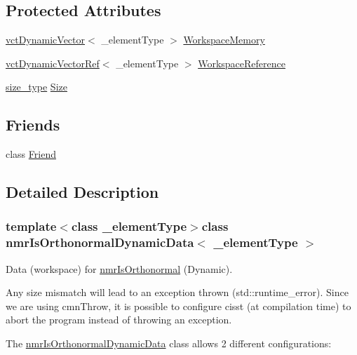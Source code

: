 \subsection*{Protected Attributes}
\begin{DoxyCompactItemize}
\item 
\hyperlink{classvct_dynamic_vector}{vct\+Dynamic\+Vector}$<$ \+\_\+element\+Type $>$ \hyperlink{classnmr_is_orthonormal_dynamic_data_aa64db85fa3c9904a4fb2c917dd171ae6}{Workspace\+Memory}
\item 
\hyperlink{classvct_dynamic_vector_ref}{vct\+Dynamic\+Vector\+Ref}$<$ \+\_\+element\+Type $>$ \hyperlink{classnmr_is_orthonormal_dynamic_data_a70b7864b872ab20af9400584387f3c21}{Workspace\+Reference}
\item 
\hyperlink{classnmr_is_orthonormal_dynamic_data_ae69581f9b270b49b1cd1d16ff29a5409}{size\+\_\+type} \hyperlink{classnmr_is_orthonormal_dynamic_data_a0335e18e8d4291e9c9ce6f6c3b7f68f0}{Size}
\end{DoxyCompactItemize}
\subsection*{Friends}
\begin{DoxyCompactItemize}
\item 
class \hyperlink{classnmr_is_orthonormal_dynamic_data_a7f8321d57e81bc613d5dbef3410ba70e}{Friend}
\end{DoxyCompactItemize}


\subsection{Detailed Description}
\subsubsection*{template$<$class \+\_\+element\+Type$>$class nmr\+Is\+Orthonormal\+Dynamic\+Data$<$ \+\_\+element\+Type $>$}

Data (workspace) for \hyperlink{nmr_is_orthonormal_8h_acf0ff1e2dbe0c988db04d9db1e2e7697}{nmr\+Is\+Orthonormal} (Dynamic). 

Any size mismatch will lead to an exception thrown (std\+::runtime\+\_\+error). Since we are using cmn\+Throw, it is possible to configure cisst (at compilation time) to abort the program instead of throwing an exception.

The \hyperlink{classnmr_is_orthonormal_dynamic_data}{nmr\+Is\+Orthonormal\+Dynamic\+Data} class allows 2 different configurations\+:


